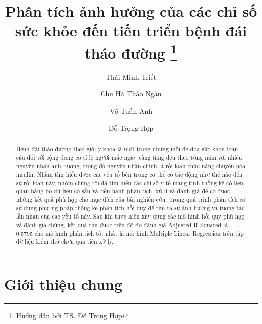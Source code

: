 \documentclass[runningheads]{llncs}
\begin{document}
%
\title{Phân tích ảnh hưởng của các chỉ số sức khỏe đến tiến triển bệnh đái tháo đường \thanks{Hướng dẫn bởi TS. Đỗ Trọng Hợp}}
%
%
\author{Thái Minh Triết \and
Chu Hà Thảo Ngân \and
Võ Tuấn Anh \and
Đỗ Trọng Hợp
}
%
%

%
\maketitle              %
%
\begin{abstract}
Bệnh đái tháo đường theo giới y khoa là một trong những mối đe doạ sức khoẻ toàn cầu đối với cộng đồng có tỉ lệ người mắc ngày càng tăng đều theo từng năm với nhiều nguyên nhân ảnh hưởng, trong đó nguyên nhân chính là rối loạn chức năng chuyển hóa insulin. Nhằm tìm hiểu được các yếu tố bên trong cơ thể có tác động như thế nào đến sự rối loạn này, nhóm chúng tôi đã tìm hiểu các chỉ số y tế mang tính thống kê có liên quan bằng bộ dữ liệu có sẵn và tiến hành phân tích, xử lí và đánh giá để có được những kết quả phù hợp cho mục đích của bài nghiên cứu. Trong quá trình phân tích có sử dụng phương pháp thống kê phân tích hồi quy để tìm ra sự ảnh hưởng và tương tác lẫn nhau của các yếu tố này. Sau khi thực hiện xây dựng các mô hình hồi quy phù hợp và đánh giá chúng, kết quả thu được trên độ đo đánh giá Adjusted R-Squared là 0.5795  cho mô hình phân tích tốt nhất là mô hình Multiple Linear Regression trên tập dữ liệu kiểm thử chưa qua tiền xử lý. 

\end{abstract}
%
%
%
\section{Giới thiệu chung}
\end{document}
